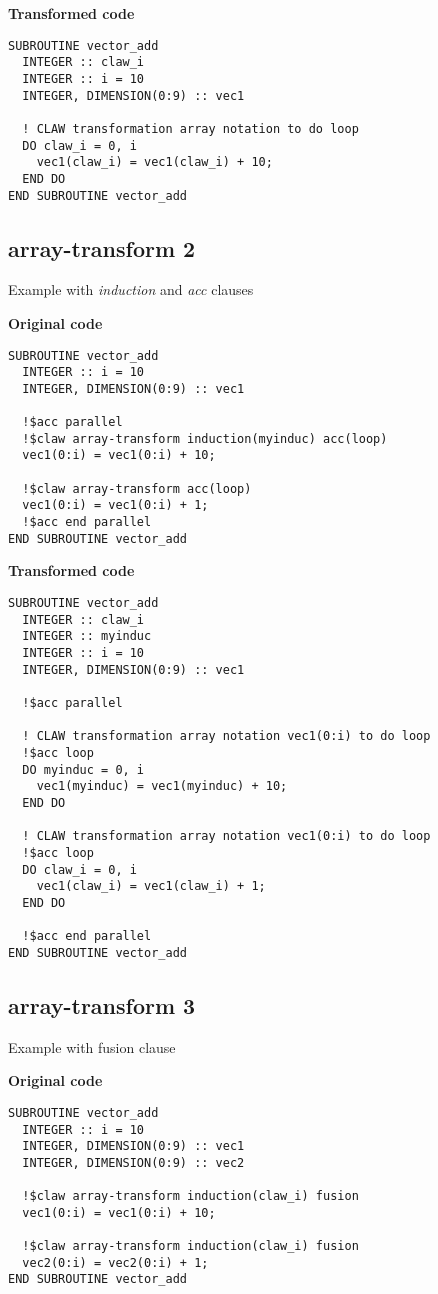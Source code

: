 \documentclass{article}
\begin{document}
\textbf{Transformed code}
\begin{lstlisting}
SUBROUTINE vector_add
  INTEGER :: claw_i
  INTEGER :: i = 10
  INTEGER, DIMENSION(0:9) :: vec1

  ! CLAW transformation array notation to do loop
  DO claw_i = 0, i
    vec1(claw_i) = vec1(claw_i) + 10;
  END DO
END SUBROUTINE vector_add
\end{lstlisting}


\subsection{array-transform 2}
\label{array-transform2}
Example with \textit{induction} and \textit{acc} clauses

\textbf{Original code}
\begin{lstlisting}
SUBROUTINE vector_add
  INTEGER :: i = 10
  INTEGER, DIMENSION(0:9) :: vec1

  !$acc parallel
  !$claw array-transform induction(myinduc) acc(loop)
  vec1(0:i) = vec1(0:i) + 10;

  !$claw array-transform acc(loop)
  vec1(0:i) = vec1(0:i) + 1;
  !$acc end parallel
END SUBROUTINE vector_add
\end{lstlisting}


\textbf{Transformed code}
\begin{lstlisting}
SUBROUTINE vector_add
  INTEGER :: claw_i
  INTEGER :: myinduc
  INTEGER :: i = 10
  INTEGER, DIMENSION(0:9) :: vec1

  !$acc parallel

  ! CLAW transformation array notation vec1(0:i) to do loop
  !$acc loop
  DO myinduc = 0, i
    vec1(myinduc) = vec1(myinduc) + 10;
  END DO

  ! CLAW transformation array notation vec1(0:i) to do loop
  !$acc loop
  DO claw_i = 0, i
    vec1(claw_i) = vec1(claw_i) + 1;
  END DO
  
  !$acc end parallel
END SUBROUTINE vector_add
\end{lstlisting}

\subsection{array-transform 3}
\label{array-transform3}
Example with fusion clause
 
\textbf{Original code}
\begin{lstlisting}
SUBROUTINE vector_add
  INTEGER :: i = 10
  INTEGER, DIMENSION(0:9) :: vec1
  INTEGER, DIMENSION(0:9) :: vec2

  !$claw array-transform induction(claw_i) fusion
  vec1(0:i) = vec1(0:i) + 10;

  !$claw array-transform induction(claw_i) fusion
  vec2(0:i) = vec2(0:i) + 1;
END SUBROUTINE vector_add
\end{lstlisting}
\end{document}
